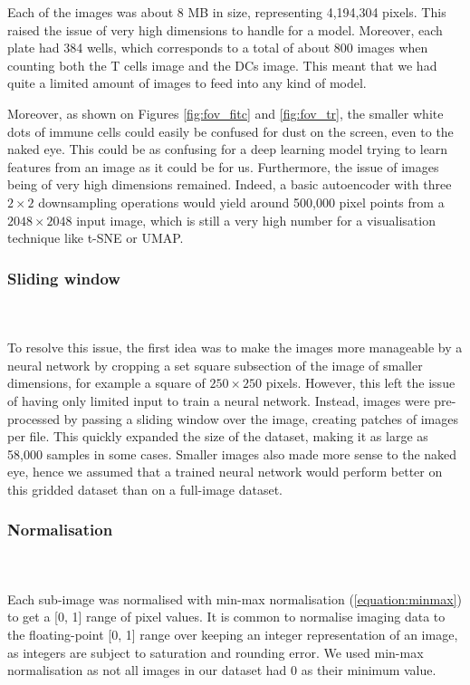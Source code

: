 Each of the images was about 8 MB in size, representing 4,194,304 pixels. This raised the issue of very high dimensions to handle for a model. Moreover, each plate had 384 wells, which corresponds to a total of about 800 images when counting both the T cells image and the DCs image. This meant that we had quite a limited amount of images to feed into any kind of model. 

Moreover, as shown on Figures \ref{fig:fov_fitc} and \ref{fig:fov_tr}, the smaller white dots of immune cells could easily be confused for dust on the screen, even to the naked eye. This could be as confusing for a deep learning model trying to learn features from an image as it could be for us. Furthermore, the issue of images being of very high dimensions remained. Indeed, a basic autoencoder with three $2\times2$ downsampling operations would yield around 500,000 pixel points from a $2048\times2048$ input image, which is still a very high number for a visualisation technique like t-SNE or UMAP. 

\bigskip
\subsubsection{Sliding window}    

\hfill\\
\hfill\\
To resolve this issue, the first idea was to make the images more manageable by a neural network by cropping a set square subsection of the image of smaller dimensions, for example a square of $250\times250$ pixels. However, this left the issue of having only limited input to train a neural network. Instead, images were pre-processed by passing a sliding window over the image, creating patches of images per file. This quickly expanded the size of the dataset, making it as large as 58,000 samples in some cases. Smaller images also made more sense to the naked eye, hence we assumed that a trained neural network would perform better on this gridded dataset than on a full-image dataset. 

\bigskip
\subsubsection{Normalisation}

\hfill\\
\hfill\\
Each sub-image was normalised with min-max normalisation (\autoref{equation:minmax}) to get a [0, 1] range of pixel values. It is common to normalise imaging data to the floating-point [0, 1] range over keeping an integer representation of an image, as integers are subject to saturation and rounding error. We used min-max normalisation as not all images in our dataset had 0 as their minimum value.  

